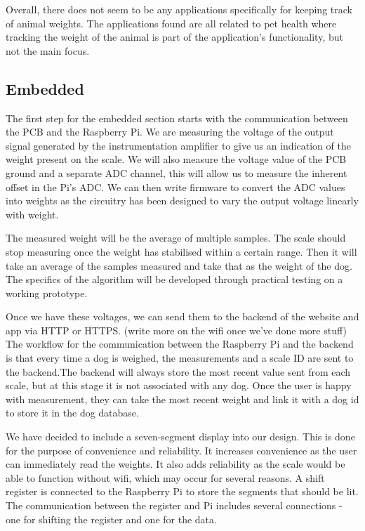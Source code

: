 Overall, there does not seem to be any applications specifically for keeping track of animal weights. The applications found are all related to pet health where tracking the weight of the animal is part of the application’s functionality, but not the main focus.


\subsection{Embedded}
The first step for the embedded section starts with the communication between the PCB and the Raspberry Pi. We are measuring the voltage of the output signal generated by the instrumentation amplifier to give us an indication of the weight present on the scale. We will also measure the voltage value of the PCB ground and a separate ADC channel, this will allow us to measure the inherent offset in the Pi’s ADC. We can then write firmware to convert the ADC values into weights as the circuitry has been designed to vary the output voltage linearly with weight. 

The measured weight will be the average of multiple samples. The scale should stop measuring once the weight has stabilised within a certain range. Then it will take an average of the samples measured and take that as the weight of the dog. The specifics of the algorithm will be developed through practical testing on a working prototype. 

Once we have these voltages, we can send them to the backend of the website and app via HTTP or HTTPS. (write more on the wifi once we’ve done more stuff)
The workflow for the communication between the Raspberry Pi and the backend is that every time a dog is weighed, the measurements and a scale ID are sent to the backend.The backend will always store the most recent value sent from each scale, but at this stage it is not associated with any dog. Once the user is happy with measurement, they can take the most recent weight and link it with a dog id to store it in the dog database.

We have decided to include a seven-segment display into our design. This is done for the purpose of convenience and reliability. It increases convenience as the user can immediately read the weights. It also adds reliability as the scale would be able to function without wifi, which may occur for several reasons. A shift register is connected to the Raspberry Pi to store the segments that should be lit. The communication between the register and Pi includes several connections - one for shifting the register and one for the data. 

